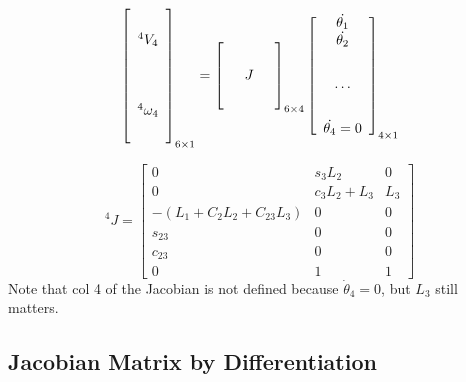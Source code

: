 \begin{ExampleCont}

\[
\left[
\begin{array}{c}
\vspace{0.1in} \\ ^4V_4 \\ \vspace{0.1in} \\\vspace{0.1in} \\ ^4\omega_4 \\ \vspace{0.1in}\\
\end{array} \right ]_{6\times 1}
=
\left [
\begin{array}{ccc}
\vspace{0.1in} & & \\
& J & \\
\vspace{0.1in}& & \\
\end{array}\right]_{6\times 4}
\left[
\begin{array}{c}
 \dot{\theta_1}   \\   \dot{\theta_2}  \\ \vspace{0.1in}\\ \dots \\ \vspace{0.1in} \\  \dot{\theta_4}=0
\end{array}
\right]_{4\times 1}
\]

\vspace{0.25in}

\[
^4J =  \left [
\begin{array}{ccc}
0		& s_3L_2	&	0	\\
0		& c_3L_2 + L_3 	& 	L_3	\\
-(L_1+C_2L_2+C_{23}L_3)	& 0	& 	0	\\
s_{23}		& 0		&	0	\\
c_{23}		& 0		& 	0	\\
0		& 1		&	1
\end{array} \right]
\]
Note that col 4 of the Jacobian is not defined because $\dot{\theta}_4=0$, but $L_3$ still matters. 
\end{ExampleCont}



\subsection{Jacobian Matrix by Differentiation}


